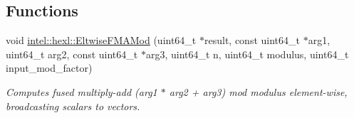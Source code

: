 \subsection*{Functions}
\begin{DoxyCompactItemize}
\item 
void \hyperlink{namespaceintel_1_1hexl_a5b65d563391b4a1a5041633aeb118aa5}{intel\+::hexl\+::\+Eltwise\+F\+M\+A\+Mod} (uint64\+\_\+t $\ast$result, const uint64\+\_\+t $\ast$arg1, uint64\+\_\+t arg2, const uint64\+\_\+t $\ast$arg3, uint64\+\_\+t n, uint64\+\_\+t modulus, uint64\+\_\+t input\+\_\+mod\+\_\+factor)
\begin{DoxyCompactList}\small\item\em Computes fused multiply-\/add ({\ttfamily arg1} $\ast$ {\ttfamily arg2} + {\ttfamily arg3}) mod {\ttfamily modulus} element-\/wise, broadcasting scalars to vectors. \end{DoxyCompactList}\end{DoxyCompactItemize}
